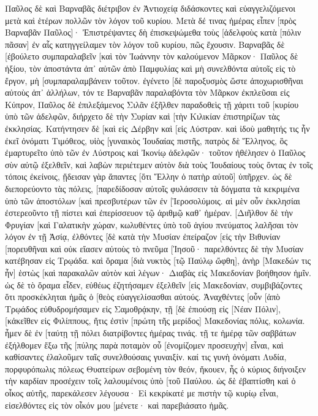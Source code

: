 Παῦλος δὲ καὶ Βαρναβᾶς διέτριβον ἐν Ἀντιοχείᾳ διδάσκοντες καὶ εὐαγγελιζόμενοι μετὰ καὶ ἑτέρων πολλῶν τὸν λόγον τοῦ κυρίου. 
Μετὰ δέ τινας ἡμέρας εἶπεν [πρὸς Βαρναβᾶν Παῦλος]· Ἐπιστρέψαντες δὴ ἐπισκεψώμεθα τοὺς [ἀδελφοὺς κατὰ [πόλιν πᾶσαν] ἐν αἷς κατηγγείλαμεν τὸν λόγον τοῦ κυρίου, πῶς ἔχουσιν. 
Βαρναβᾶς δὲ [ἐβούλετο συμπαραλαβεῖν [καὶ τὸν Ἰωάννην τὸν καλούμενον Μᾶρκον· 
Παῦλος δὲ ἠξίου, τὸν ἀποστάντα ἀπ᾽ αὐτῶν ἀπὸ Παμφυλίας καὶ μὴ συνελθόντα αὐτοῖς εἰς τὸ ἔργον, μὴ [συμπαραλαμβάνειν τοῦτον. 
ἐγένετο [δὲ παροξυσμὸς ὥστε ἀποχωρισθῆναι αὐτοὺς ἀπ᾽ ἀλλήλων, τόν τε Βαρναβᾶν παραλαβόντα τὸν Μᾶρκον ἐκπλεῦσαι εἰς Κύπρον, 
Παῦλος δὲ ἐπιλεξάμενος Σιλᾶν ἐξῆλθεν παραδοθεὶς τῇ χάριτι τοῦ [κυρίου ὑπὸ τῶν ἀδελφῶν, 
διήρχετο δὲ τὴν Συρίαν καὶ [τὴν Κιλικίαν ἐπιστηρίζων τὰς ἐκκλησίας. 
Κατήντησεν δὲ [καὶ εἰς Δέρβην καὶ [εἰς Λύστραν. καὶ ἰδοὺ μαθητής τις ἦν ἐκεῖ ὀνόματι Τιμόθεος, υἱὸς [γυναικὸς Ἰουδαίας πιστῆς, πατρὸς δὲ Ἕλληνος, 
ὃς ἐμαρτυρεῖτο ὑπὸ τῶν ἐν Λύστροις καὶ Ἰκονίῳ ἀδελφῶν· 
τοῦτον ἠθέλησεν ὁ Παῦλος σὺν αὐτῷ ἐξελθεῖν, καὶ λαβὼν περιέτεμεν αὐτὸν διὰ τοὺς Ἰουδαίους τοὺς ὄντας ἐν τοῖς τόποις ἐκείνοις, ᾔδεισαν γὰρ ἅπαντες [ὅτι Ἕλλην ὁ πατὴρ αὐτοῦ] ὑπῆρχεν. 
ὡς δὲ διεπορεύοντο τὰς πόλεις, [παρεδίδοσαν αὐτοῖς φυλάσσειν τὰ δόγματα τὰ κεκριμένα ὑπὸ τῶν ἀποστόλων [καὶ πρεσβυτέρων τῶν ἐν [Ἱεροσολύμοις. 
αἱ μὲν οὖν ἐκκλησίαι ἐστερεοῦντο τῇ πίστει καὶ ἐπερίσσευον τῷ ἀριθμῷ καθ᾽ ἡμέραν. 
[Διῆλθον δὲ τὴν Φρυγίαν [καὶ Γαλατικὴν χώραν, κωλυθέντες ὑπὸ τοῦ ἁγίου πνεύματος λαλῆσαι τὸν λόγον ἐν τῇ Ἀσίᾳ, 
ἐλθόντες [δὲ κατὰ τὴν Μυσίαν ἐπείραζον [εἰς τὴν Βιθυνίαν [πορευθῆναι καὶ οὐκ εἴασεν αὐτοὺς τὸ πνεῦμα [Ἰησοῦ· 
παρελθόντες δὲ τὴν Μυσίαν κατέβησαν εἰς Τρῳάδα. 
καὶ ὅραμα [διὰ νυκτὸς [τῷ Παύλῳ ὤφθη], ἀνὴρ [Μακεδών τις ἦν] ἑστὼς [καὶ παρακαλῶν αὐτὸν καὶ λέγων· Διαβὰς εἰς Μακεδονίαν βοήθησον ἡμῖν. 
ὡς δὲ τὸ ὅραμα εἶδεν, εὐθέως ἐζητήσαμεν ἐξελθεῖν [εἰς Μακεδονίαν, συμβιβάζοντες ὅτι προσκέκληται ἡμᾶς ὁ [θεὸς εὐαγγελίσασθαι αὐτούς. 
Ἀναχθέντες [οὖν [ἀπὸ Τρῳάδος εὐθυδρομήσαμεν εἰς Σαμοθρᾴκην, τῇ [δὲ ἐπιούσῃ εἰς [Νέαν Πόλιν], 
[κἀκεῖθεν εἰς Φιλίππους, ἥτις ἐστὶν [πρώτη τῆς μερίδος] Μακεδονίας πόλις, κολωνία. ἦμεν δὲ ἐν [ταύτῃ τῇ πόλει διατρίβοντες ἡμέρας τινάς. 
τῇ τε ἡμέρᾳ τῶν σαββάτων ἐξήλθομεν ἔξω τῆς [πύλης παρὰ ποταμὸν οὗ [ἐνομίζομεν προσευχὴν] εἶναι, καὶ καθίσαντες ἐλαλοῦμεν ταῖς συνελθούσαις γυναιξίν. 
καί τις γυνὴ ὀνόματι Λυδία, πορφυρόπωλις πόλεως Θυατείρων σεβομένη τὸν θεόν, ἤκουεν, ἧς ὁ κύριος διήνοιξεν τὴν καρδίαν προσέχειν τοῖς λαλουμένοις ὑπὸ [τοῦ Παύλου. 
ὡς δὲ ἐβαπτίσθη καὶ ὁ οἶκος αὐτῆς, παρεκάλεσεν λέγουσα· Εἰ κεκρίκατέ με πιστὴν τῷ κυρίῳ εἶναι, εἰσελθόντες εἰς τὸν οἶκόν μου [μένετε· καὶ παρεβιάσατο ἡμᾶς. 
